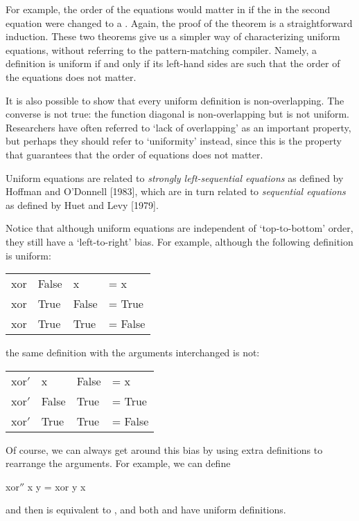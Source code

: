 
For example, the order of the equations would matter in  if the  in the
second equation were changed to a . Again, the proof of the theorem is a
straightforward induction. These two theorems give us a simpler way of
characterizing uniform equations, without referring to the pattern-matching
compiler. Namely, a definition is uniform if and only if its left-hand sides are
such that the order of the equations does not matter.

It is also possible to show that every uniform definition is non-overlapping.
The converse is not true: the function diagonal is non-overlapping but is not
uniform. Researchers have often referred to `lack of overlapping' as an
important property, but perhaps they should refer to `uniformity' instead,
since this is the property that guarantees that the order of equations does not
matter.

Uniform equations are related to \textit{strongly left-sequential equations} as
defined by Hoffman and O'Donnell [1983], which are in turn related to
\textit{sequential equations} as defined by Huet and Levy [1979].

Notice that although uniform equations are independent of `top-to-bottom'
order, they still have a `left-to-right' bias. For example, although the
following definition is uniform:
\begin{mlcoded}
	\begin{tabular}{llll}
		xor &False &x &= x \\
		xor &True &False &= True \\
		xor &True &True &= False
	\end{tabular}
\end{mlcoded}
the same definition with the arguments interchanged is not:
\begin{mlcoded}
	\begin{tabular}{llll}
		xor$'$ &x &False &= x \\
		xor$'$ &False &True &= True \\
		xor$'$ &True &True &= False
	\end{tabular}
\end{mlcoded}
Of course, we can always get around this bias by using extra definitions to
rearrange the arguments. For example, we can define
\begin{mlcoded}
xor$''$ x y = xor y x
\end{mlcoded}
and then  is equivalent to , and both  and  have uniform
definitions.

